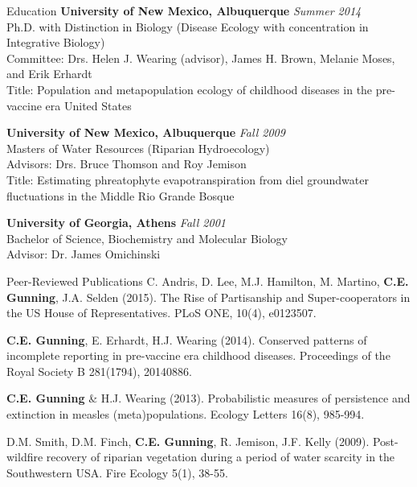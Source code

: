 \documentclass{resume} %
\begin{document}
\begin{rSection}{Education}
{\bf University of New Mexico, Albuquerque} \hfill {\em Summer 2014} \\ 
Ph.D. with Distinction in Biology (Disease Ecology with concentration in
Integrative Biology) \\
Committee: Drs. Helen J. Wearing (advisor), James H. Brown, Melanie Moses, and Erik Erhardt\\
Title: Population and metapopulation ecology of childhood diseases in the pre-vaccine era United States

{\bf University of New Mexico, Albuquerque} \hfill {\em Fall 2009} \\ 
Masters of Water Resources (Riparian Hydroecology) \\
Advisors: Drs. Bruce Thomson and Roy Jemison \\
Title: Estimating phreatophyte evapotranspiration from diel groundwater fluctuations in the Middle Rio Grande Bosque

{\bf University of Georgia, Athens} \hfill {\em Fall 2001} \\ 
Bachelor of Science, Biochemistry and Molecular Biology \\
Advisor: Dr. James Omichinski
\end{rSection}


\begin{rSection}{Peer-Reviewed Publications}
C. Andris, D. Lee, M.J.  Hamilton, M. Martino, {\bf C.E. Gunning},  J.A. Selden (2015).
The Rise of Partisanship and Super-cooperators in the US House of Representatives.
PLoS ONE, 10(4), e0123507.

{\bf C.E. Gunning}, E. Erhardt, H.J. Wearing (2014). 
Conserved patterns of incomplete reporting in pre-vaccine era childhood diseases.
Proceedings of the Royal Society B 281(1794), 20140886. 

{\bf C.E. Gunning} \& H.J. Wearing (2013). Probabilistic measures of persistence
and extinction in measles (meta)populations. Ecology Letters 16(8), 985-994.

D.M. Smith, D.M. Finch, {\bf C.E. Gunning}, R. Jemison, J.F. Kelly (2009). Post-wildfire recovery of riparian vegetation during a period of water scarcity in the Southwestern USA. Fire Ecology 5(1), 38-55.
\end{rSection}
\end{document}
